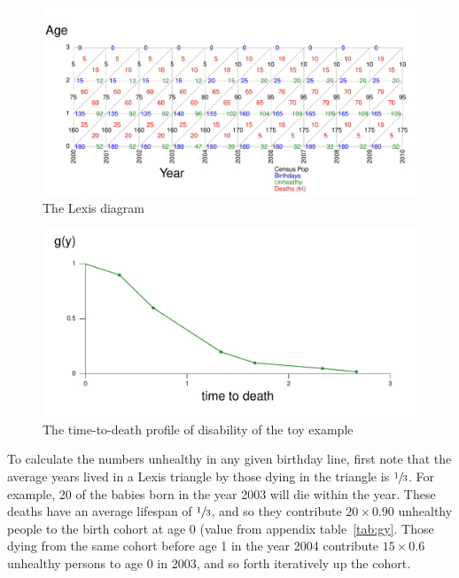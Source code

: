\documentclass[11pt,oneside,a4paper]{article} %
\begin{document}
\begin{figure}
\begin{adjustwidth}{-1.5cm}{}
	\centering
	\includegraphics[scale=.6]{Figures/DiagramLexis.pdf}
	\caption{The Lexis diagram}
	\label{fig:Fig_DiagramLexis}
\end{adjustwidth}
\end{figure}



\begin{figure}
\begin{adjustwidth}{-1.5cm}{}
	\centering
	\includegraphics[scale=.6]{Figures/TTDgy.pdf}
	\caption{The time-to-death profile of disability of the toy example}
	\label{fig:Fig_TTDgy}
\end{adjustwidth}
\end{figure}

To calculate the numbers unhealthy in any given birthday line, first note that
the average years lived in a Lexis triangle by those dying in the triangle is
$\sfrac{1}{3}$. For example, 20 of the
babies born in the year 2003 will die within the year. These deaths have an
average lifespan of $\sfrac{1}{3}$, and so they contribute $20\times0.90$ unhealthy
people to the birth cohort at age 0 (value from appendix table~\ref{tab:gy}.
Those dying from the same cohort before age 1 in the year 2004 contribute
$15\times0.6$ unhealthy persons to age 0 in 2003, and so forth iteratively up
the cohort.
\end{document}
